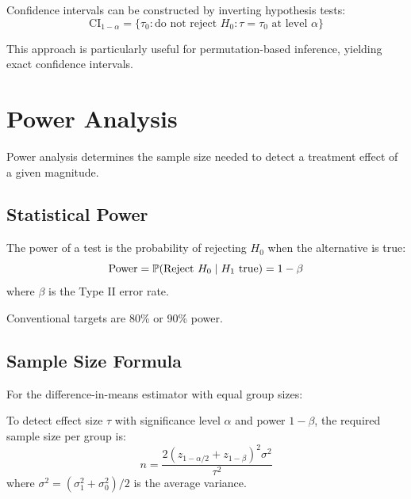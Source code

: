 Confidence intervals can be constructed by inverting hypothesis tests:
\begin{equation}
\text{CI}_{1-\alpha} = \{\tau_0 : \text{do not reject } H_0: \tau = \tau_0 \text{ at level } \alpha\}
\label{eq:ci_inversion}
\end{equation}

This approach is particularly useful for permutation-based inference, yielding exact confidence intervals.


\section{Power Analysis}
\label{sec:power_analysis}

Power analysis determines the sample size needed to detect a treatment effect of a given magnitude.

\subsection{Statistical Power}

\begin{definition}
\label{def:power}
The power of a test is the probability of rejecting $H_0$ when the alternative is true:
\begin{equation}
\text{Power} = \mathbb{P}(\text{Reject } H_0 \mid H_1 \text{ true}) = 1 - \beta
\label{eq:power}
\end{equation}
where $\beta$ is the Type II error rate.
\end{definition}

Conventional targets are 80\% or 90\% power.

\subsection{Sample Size Formula}

For the difference-in-means estimator with equal group sizes:

\begin{theorem}
\label{thm:sample_size}
To detect effect size $\tau$ with significance level $\alpha$ and power $1-\beta$, the required sample size per group is:
\begin{equation}
n = \frac{2(z_{1-\alpha/2} + z_{1-\beta})^2 \sigma^2}{\tau^2}
\label{eq:sample_size}
\end{equation}
where $\sigma^2 = (\sigma_1^2 + \sigma_0^2)/2$ is the average variance.
\end{theorem}

